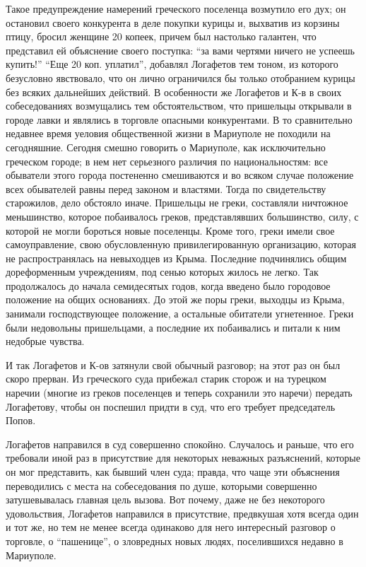 \documentclass[a4paper,20pt]{article}
\begin{document}
Такое предупреждение намерений греческого поселенца возмутило его дух; он остановил своего конкурента в деле покупки курицы
и, выхватив из корзины птицу, бросил женщине 20 копеек, причем был настолько галантен, что представил ей объяснение своего поступка:
``за вами чертями ничего не успеешь купить!''
``Еще 20 коп. уплатил'', добавлял Логафетов тем тоном, из которого 
безусловно явствовало, что он лично ограничился бы только отобранием
курицы без всяких дальнейших действий. В особенности
же Логафетов и К-в в своих собеседованиях возмущались тем обстоятельством, 
что пришельцы открывали в
городе лавки и являлись в торговле опасными конкурентами. В то сравнительно
недавнее время уеловия общественной жизни в Мариуполе не походили на сегодняшние.
Сегодня смешно говорить о Мариуполе, как исключительно греческом городе; в нем
нет серьезного различия по национальностям: все обыватели этого города
постененно смешиваются и во всяком случае положение всех обывателей равны перед
законом и властями. Тогда по свидетельству старожилов, дело обстояло иначе.
Пришельцы не греки, составляли ничтожное меньшинство, которое побаивалось
греков, представлявших большинство, силу, с которой не могли бороться новые
поселенцы. Кроме того, греки имели свое самоуправление, свою обусловленную
привилегированную организацию, которая не распространялась на невыходцев из
Крыма. Последние подчинялись общим дореформенным учреждениям, под сенью которых
жилось не легко. Так продолжалось до начала семидесятых годов, когда введено
было городовое положение на общих основаниях. До этой же поры греки, выходцы из
Крыма, занимали господствующее положение, а остальные обитатели угнетенное.
Греки были недовольны пришельцами, а последние их побаивались и питали к ним
недобрые чувства.

И так Логафетов и К-ов затянули свой обычный разговор; на этот раз он был скоро
прерван. Из греческого суда прибежал старик сторож и на турецком наречии
(многие из греков поселенцев и теперь сохранили это наречи) передать
Логафетову, чтобы он поспешил придти в суд, что его требует председатель Попов.

Логафетов направился в суд совершенно спокойно.
Случалось и раньше, что его требовали иной раз в присутствие
для некоторых неважных разъяснений, которые он мог представить, как бывший член суда;
правда, что чаще эти объяснения переводились с места на собеседования по душе, которыми совершенно
затушевывалась главная цель вызова. Вот почему, даже не без некоторого удовольствия, Логафетов направился 
в присутствие, предвкушая хотя всегда один и тот же, но тем не менее всегда
одинаково для него интересный разговор о торговле, о ``пашенице'', о зловредных
новых людях, поселившихся недавно в Мариуполе.
\end{document}
